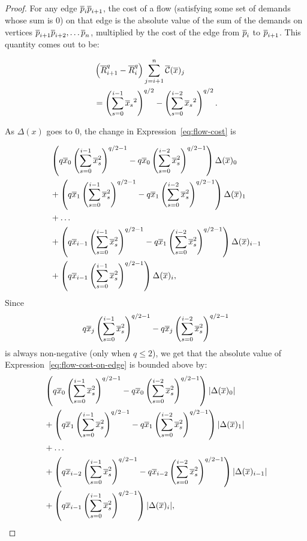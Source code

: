 \begin{proof} For any edge $\overline{p}_i\overline{p}_{i+1}$, the cost of a flow (satisfying
some set of demands whose sum is $0$) on that edge is the absolute value of
the sum of the demands on vertices $\overline{p}_{i+1} \overline{p}_{i+2}, \ldots \overline{p}_n$,
multiplied by the cost of the edge from $\overline{p}_i$ to $\overline{p}_{i+1}$. This
quantity comes out to be:

\begin{align} &\left(\overline{R}_{i+1}^q-\overline{R}_{i}^q \right) \sum_{j=i+1}^n \overline{\mathcal{C}}(\overline{x})_j
\\
\label{eq:flow-cost}
&=\left(\sum_{s=0}^{i-1} {\overline{x}_s}^2\right)^{q/2} -\left(\sum_{s=0}^{i-2}
{\overline{x}_s}^2\right)^{q/2}.
\end{align}

As $\Delta(x)$ goes to $0$, the change in Expression~\ref{eq:flow-cost} is

\begin{align}
\begin{split}
\label{eq:flow-cost-on-edge}
&
\left(q\overline{x}_0 \left(\sum_{s=0}^{i-1} \overline{x}_s^2 \right)^{q/2-1} -
q\overline{x}_0\left(\sum_{s=0}^{i-2} \overline{x}_s^2 \right)^{q/2-1} \right) \Delta(\overline{x})_0
\\
&+
\left(q\overline{x}_1 \left(\sum_{s=0}^{i-1} \overline{x}_s^2 \right)^{q/2-1} -
q\overline{x}_1\left(\sum_{s=0}^{i-2}\overline{x}_s^2 \right)^{q/2-1} \right) \Delta(\overline{x})_1
\\
&+ \ldots
\\
&+
\left(q\overline{x}_{i-1} \left(\sum_{s=0}^{i-1} \overline{x}_s^2 \right)^{q/2-1} -
q\overline{x}_1\left(\sum_{s=0}^{i-2}\overline{x}_s^2 \right)^{q/2-1}
\right)\Delta(\overline{x})_{i-1}
\\
&+
\left(q\overline{x}_{i-1} \left(\sum_{s=0}^{i-1} \overline{x}_s^2
\right)^{q/2-1}\right)\Delta(\overline{x})_i,
\end{split}
\end{align}
Since 
\[
q\overline{x}_j\left(\sum_{s=0}^{i-1} \overline{x}_s^2\right)^{q/2-1} - q\overline{x}_j\left(\sum_{s=0}^{i-2}
\overline{x}_s^2 \right)^{q/2-1}\]
is always non-negative (only when $q \leq 2$), we get that the absolute value of
Expression~\ref{eq:flow-cost-on-edge} is bounded above by:
\begin{align}
\begin{split}
\label{eq:flow-cost-upper-bound}
&
\left(q\overline{x}_0 \left(\sum_{s=0}^{i-1} \overline{x}_s^2 \right)^{q/2-1} -
q\overline{x}_0\left(\sum_{s=0}^{i-2} \overline{x}_s^2 \right)^{q/2-1} \right)
|\Delta(\overline{x})_0|
\\
&+
\left(q\overline{x}_1 \left(\sum_{s=0}^{i-1} \overline{x}_s^2 \right)^{q/2-1} -
q\overline{x}_1\left(\sum_{s=0}^{i-2}\overline{x}_s^2 \right)^{q/2-1} \right) |\Delta(\overline{x})_1|
\\
&+ \ldots
\\
&+
\left(q\overline{x}_{i-2} \left(\sum_{s=0}^{i-1} \overline{x}_s^2 \right)^{q/2-1} -
q\overline{x}_{i-2}\left(\sum_{s=0}^{i-2}\overline{x}_s^2 \right)^{q/2-1}
\right)|\Delta(\overline{x})_{i-1}|
\\
&+
\left(q\overline{x}_{i-1} \left(\sum_{s=0}^{i-1} \overline{x}_s^2
\right)^{q/2-1}\right)|\Delta(\overline{x})_i|,
\end{split}
\end{align}


\end{proof}
